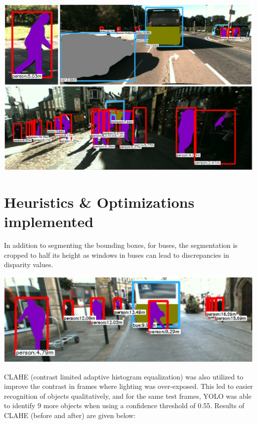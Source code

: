 \documentclass{article}
\begin{document}
	\begin{minipage}{1.0\linewidth}
		\begin{center}
			\includegraphics[width=0.67\linewidth]{"../_submission/semantic_segmentation.png"}
		\end{center}
	\end{minipage}
	
	
	\section{Heuristics \& Optimizations implemented}
	
	In addition to segmenting the bounding boxes, for buses, the segmentation is cropped to half its height as windows in buses can lead to discrepancies in disparity values.

	\begin{minipage}{1.0\linewidth}
	\includegraphics[width=\linewidth]{"../_submission/cut_heuristic.png"}
	\end{minipage}

	CLAHE (contrast limited adaptive histogram equalization) was also utilized to improve the contrast in frames where lighting was over-exposed. This led to easier recognition of objects qualitatively, and for the same test frames, YOLO was able to identify 9 more objects when using a confidence threshold of 0.55. Results of CLAHE (before and after) are given below:
	
\end{document}
